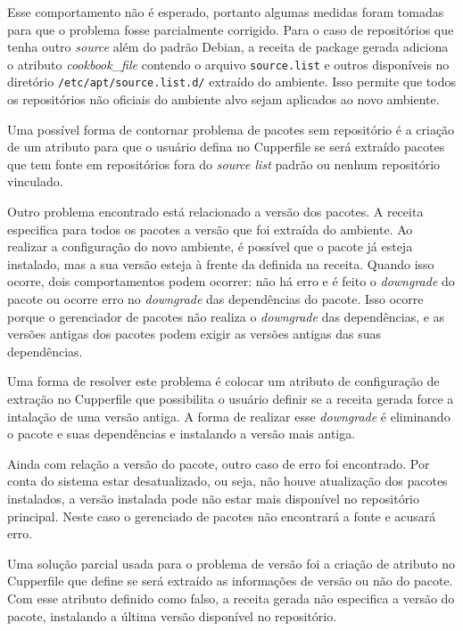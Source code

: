 Esse comportamento não é esperado, portanto algumas medidas foram tomadas para
que o problema fosse parcialmente corrigido. Para o caso de repositórios que
tenha outro \textit{source} além do padrão Debian, a receita de package gerada adiciona
o atributo \textit{cookbook\_file} contendo o arquivo \texttt{source.list} e outros disponíveis
no diretório \texttt{/etc/apt/source.list.d/} extraído do ambiente. Isso permite
que todos os repositórios não oficiais do ambiente alvo sejam aplicados ao novo ambiente.

Uma possível forma de contornar problema de pacotes sem repositório é
a criação de um atributo para que o usuário defina no Cupperfile se
será extraído pacotes que tem fonte em repositórios fora do \textit{source list} padrão ou
nenhum repositório vinculado.

Outro problema encontrado está relacionado a versão dos pacotes.
A receita especifica para todos os pacotes a versão que foi extraída do ambiente.
Ao realizar a configuração do novo ambiente, é possível que o pacote já esteja instalado,
mas a sua versão esteja à frente da definida na receita. Quando isso ocorre, dois comportamentos
podem ocorrer: não há erro e é feito o \textit{downgrade} do pacote ou ocorre erro no \textit{downgrade} das
dependências do pacote. Isso ocorre porque o gerenciador de pacotes não realiza o \textit{downgrade}
das dependências, e as versões antigas dos pacotes podem exigir as versões antigas das suas
dependências.

Uma forma de resolver este problema é colocar um atributo de configuração de extração no
Cupperfile que possibilita o usuário definir se a receita gerada force a intalação de uma
versão antiga. A forma de realizar esse \textit{downgrade} é eliminando o pacote e suas dependências
e instalando a versão mais antiga.

Ainda com relação a versão do pacote, outro caso de erro foi encontrado.
Por conta do sistema estar desatualizado, ou seja, não houve atualização dos pacotes
instalados, a versão instalada pode não estar mais disponível no repositório principal.
Neste caso o gerenciado de pacotes não encontrará a fonte e acusará erro.

Uma solução parcial usada para o problema de versão foi a criação de atributo no
Cupperfile que define se será extraído as informações de versão ou não do pacote.
Com esse atributo definido como falso, a receita gerada não especifica a versão
do pacote, instalando a última versão disponível no repositório.
